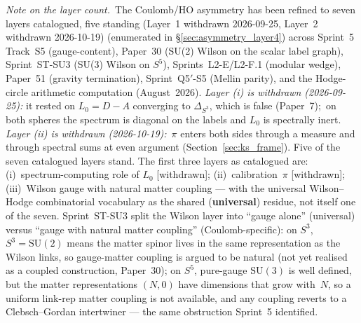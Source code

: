 \documentclass[twocolumn,pra,amsmath,amssymb,superscriptaddress]{revtex4-2}
\begin{document}
\emph{Note on the layer count.}\ The Coulomb/HO asymmetry has been
refined to seven layers catalogued, five standing (Layer~1 withdrawn
2026-09-25, Layer~2 withdrawn 2026-10-19) (enumerated in \S\ref{sec:asymmetry_layer4}) across Sprint~5 Track~S5 (gauge-content),
Paper~30 (SU(2) Wilson on the scalar label graph), Sprint~ST-SU3 (SU(3) Wilson on
$S^5$), Sprints~L2-E/L2-F.1 (modular wedge), Paper~51 (gravity termination),
Sprint~Q5$'$-S5 (Mellin parity), and the Hodge-circle
arithmetic computation (August~2026).  \emph{Layer (i) is withdrawn
(2026-09-25):} it rested on $L_0 = D - A$ converging to $\Delta_{S^3}$,
which is false (Paper~7);\ on both spheres the spectrum is diagonal on
the labels and $L_0$ is spectrally inert.  \emph{Layer (ii) is withdrawn
(2026-10-19):}\ $\pi$ enters both sides through a measure and through
spectral sums at even argument (Section~\ref{sec:ks_frame}).  Five of
the seven catalogued layers stand.  The first three layers as catalogued are:
(i)~spectrum-computing role of $L_0$ [withdrawn];
(ii)~calibration~$\pi$ [withdrawn]; (iii)~Wilson gauge with natural matter
coupling --- with the universal Wilson--Hodge combinatorial vocabulary
as the shared (\textbf{universal}) residue, not itself one of the seven.  Sprint~ST-SU3 split
the Wilson layer into ``gauge alone'' (universal) versus ``gauge
with natural matter coupling'' (Coulomb-specific): on $S^3$,
$S^3 = \mathrm{SU}(2)$ means the matter spinor lives in the same
representation as the Wilson links, so gauge-matter coupling is
argued to be natural (not yet realised as a coupled construction,
Paper~30); on $S^5$, pure-gauge $\mathrm{SU}(3)$ is well defined, but the matter representations $(N, 0)$ have
dimensions that grow with~$N$, so a uniform link-rep matter coupling
is not available, and any coupling reverts to a Clebsch--Gordan
intertwiner --- the same obstruction Sprint~5 identified.
\end{document}
